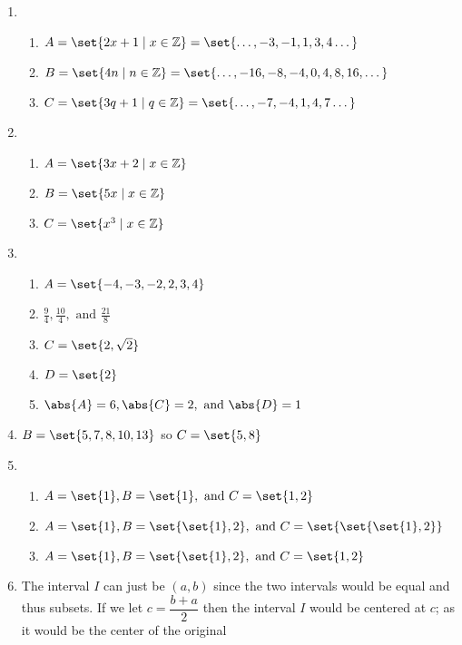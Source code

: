 \documentclass[12pt]{article}
\begin{document}
\begin{enumerate}[label=1.\arabic*]
    \item
      \begin{enumerate}[label=(\alph*)]
        \item $A = \set{2x + 1 \mid x \in \mathbb{Z}} 
        = \set{\dots, -3, -1, 1, 3, 4\dots}$
        \item $B = \set{4n \mid n \in \mathbb{Z}} 
        = \set{\dots, -16, -8, -4, 0, 4, 8, 16, \dots}$
        \item $C = \set{3q + 1 \mid q \in \mathbb{Z}} 
        = \set{\dots, -7, -4, 1, 4, 7\dots}$
      \end{enumerate}
    \item
      \begin{enumerate}[label=(\alph*)]
        \item $A = \set{3x + 2 \mid x \in \mathbb{Z}}$
        \item $B = \set{5x \mid x \in \mathbb{Z}}$
        \item $C = \set{x^3 \mid x \in \mathbb{Z}}$
      \end{enumerate}
    \item
      \begin{enumerate}[label=(\alph*)]
        \item $A =\set{-4,-3,-2,2,3,4}$
        \item $\frac{9}{4},\frac{10}{4}, \text{ and } \frac{21}{8}$
        \item $C =\set{2, \sqrt{2}}$
        \item $D =\set{2}$
        \item $\abs{A}=6,\abs{C}=2, \text{ and } \abs{D}=1$
      \end{enumerate}
    \item $B=\set{5,7,8,10,13}$ so $C=\set{5,8}$
    \item
      \begin{enumerate}[label=(\alph*)]
        \item $A=\set{1},B=\set{1}, \text{ and } C=\set{1, 2}$
        \item $A=\set{1},B=\set{\set{1}, 2}, \text{ and } C=\set{\set{\set{1}, 2}}$
        \item $A=\set{1},B=\set{\set{1}, 2}, \text{ and } C=\set{1, 2}$
      \end{enumerate}
    \item The interval $I$ can just be $\left(a, b\right)$ since the two intervals would be equal and thus subsets.
    If we let $c = \dfrac{b + a}{2}$ then the interval $I$ would be centered at $c$; as it would be the center of the original

\end{enumerate}
\end{document}
